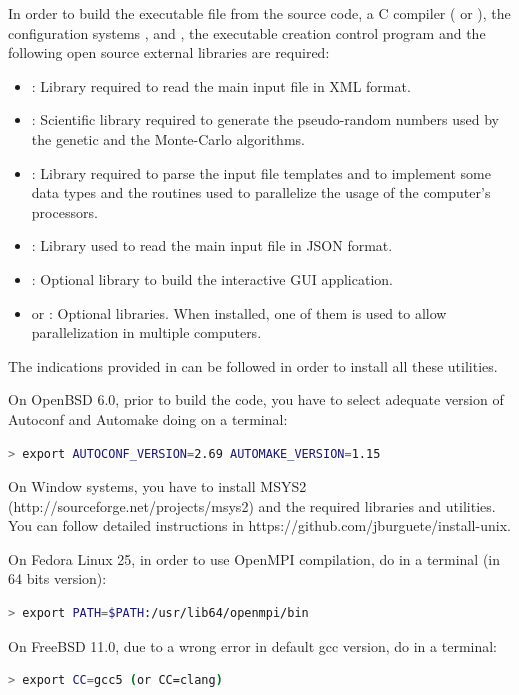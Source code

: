 \documentclass[a4paper]{report}
\begin{document}
In order to build the executable file from the source code, a C compiler (\citet{gcc} or \citet{clang}), the configuration systems \citet{autoconf}, \citet{automake} and \citet{pkgconfig}, the executable creation control program \citet{gnumake} and the following open source external libraries are required:
\begin{itemize}
\item\citet{libxml}: Library required to read the main input file in XML format.
\item\citet{gsl}: Scientific library required to generate the pseudo-random numbers used by the genetic and the Monte-Carlo algorithms.
\item\citet{glib}: Library required to parse the input file templates and to implement some data types and the routines used to parallelize the usage of the computer's processors.
\item\citet{json-glib}: Library used to read the main input file in JSON format.
\item\citet{gtk}: Optional library to build the interactive GUI application.
\item\citet{openmpi} or \citet{mpich}: Optional libraries. When installed, one
of them is used to allow parallelization in multiple computers.
\end{itemize}
The indications provided in \citet{install-unix} can be followed in order to install all these utilities.

On OpenBSD 6.0, prior to build the code, you have to select adequate version of Autoconf and Automake doing on a terminal:
\begin{lstlisting}[language=bash,basicstyle=\scriptsize]
> export AUTOCONF_VERSION=2.69 AUTOMAKE_VERSION=1.15
\end{lstlisting}

On Window systems, you have to install MSYS2
(http://sourceforge.net/projects/msys2) and the required libraries and
utilities. You can follow detailed instructions in
https://github.com/jburguete/install-unix.

On Fedora Linux 25, in order to use OpenMPI compilation, do in a terminal (in 64
bits version):
\begin{lstlisting}[language=bash,basicstyle=\scriptsize]
> export PATH=$PATH:/usr/lib64/openmpi/bin
\end{lstlisting}

On FreeBSD 11.0, due to a wrong error in default gcc version, do in a terminal:
\begin{lstlisting}[language=bash,basicstyle=\scriptsize]
> export CC=gcc5 (or CC=clang)
\end{lstlisting}
\end{document}
